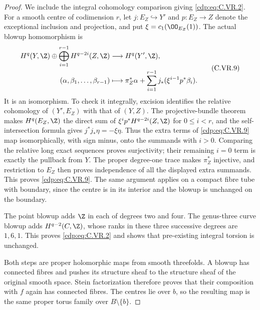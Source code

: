 \begin{proof}
We include the integral cohomology comparison giving \eqref{cdp:eq:C.VR.2}.
For a smooth centre of codimension $r$, let $j:E_Z\hookrightarrow Y'$
and $p:E_Z\to Z$ denote the exceptional inclusion and projection,
and put $\xi=c_1(\OO_{E_Z}(1))$. The actual blowup homomorphism is
\[
 \begin{split}
 H^q(Y,\Z)\oplus\bigoplus_{i=1}^{r-1}H^{q-2i}(Z,\Z)
   &\longrightarrow H^q(Y',\Z),\\
 (\alpha,\beta_1,\ldots,\beta_{r-1})
   &\longmapsto \pi_Z^*\alpha+
       \sum_{i=1}^{r-1}j_*(\xi^{i-1}p^*\beta_i).
 \end{split}                                      \tag{C.VR.9}\label{cdp:eq:C.VR.9}
\]
It is an isomorphism. To check it integrally, excision identifies the
relative cohomology of $(Y',E_Z)$ with that of $(Y,Z)$. The
projective-bundle theorem makes $H^q(E_Z,\Z)$ the direct sum of
$\xi^i p^*H^{q-2i}(Z,\Z)$ for $0\le i<r$, and the self-intersection
formula gives $j^*j_*\eta=-\xi\eta$. Thus the extra terms of
\eqref{cdp:eq:C.VR.9} map isomorphically, with sign minus, onto the summands with
$i>0$. Comparing the relative long exact sequences proves
surjectivity; their remaining $i=0$ term is exactly the pullback from
$Y$. The proper degree-one trace makes $\pi_Z^*$ injective, and
restriction to $E_Z$ then proves independence of all the displayed
extra summands. This proves \eqref{cdp:eq:C.VR.9}. The same argument applies on a
compact fibre tube with boundary, since the centre is in its interior
and the blowup is unchanged on the boundary.

The point blowup adds $\Z$ in each of degrees two and four. The
genus-three curve blowup adds $H^{q-2}(C,\Z)$, whose ranks in these
three successive degrees are $1,6,1$. This proves \eqref{cdp:eq:C.VR.2} and shows
that pre-existing integral torsion is unchanged.

Both steps are proper holomorphic maps from smooth threefolds. A
blowup has connected fibres and pushes its structure sheaf to the
structure sheaf of the original smooth space. Stein factorization
therefore proves that their composition with $f$ again has connected
fibres. The centres lie over $b$, so the resulting map is the same
proper torus family over $B\setminus\{b\}$.


\end{proof}
